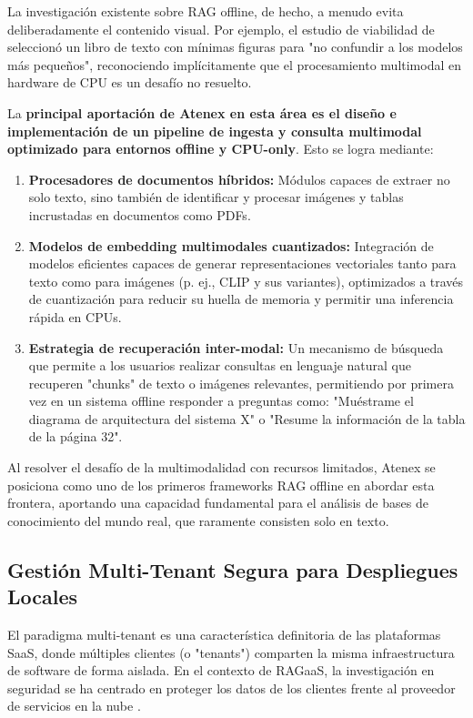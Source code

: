 La investigación existente sobre RAG offline, de hecho, a menudo evita deliberadamente el contenido visual. Por ejemplo, el estudio de viabilidad de \cite{Tyndall2025OfflineRAG} seleccionó un libro de texto con mínimas figuras para "no confundir a los modelos más pequeños", reconociendo implícitamente que el procesamiento multimodal en hardware de CPU es un desafío no resuelto.

La \textbf{principal aportación de Atenex en esta área es el diseño e implementación de un pipeline de ingesta y consulta multimodal optimizado para entornos offline y CPU-only}. Esto se logra mediante:
\begin{enumerate}
    \item \textbf{Procesadores de documentos híbridos:} Módulos capaces de extraer no solo texto, sino también de identificar y procesar imágenes y tablas incrustadas en documentos como PDFs.
    \item \textbf{Modelos de embedding multimodales cuantizados:} Integración de modelos eficientes capaces de generar representaciones vectoriales tanto para texto como para imágenes (p. ej., CLIP y sus variantes), optimizados a través de cuantización para reducir su huella de memoria y permitir una inferencia rápida en CPUs.
    \item \textbf{Estrategia de recuperación inter-modal:} Un mecanismo de búsqueda que permite a los usuarios realizar consultas en lenguaje natural que recuperen "chunks" de texto o imágenes relevantes, permitiendo por primera vez en un sistema offline responder a preguntas como: "Muéstrame el diagrama de arquitectura del sistema X" o "Resume la información de la tabla de la página 32".
\end{enumerate}
Al resolver el desafío de la multimodalidad con recursos limitados, Atenex se posiciona como uno de los primeros frameworks RAG offline en abordar esta frontera, aportando una capacidad fundamental para el análisis de bases de conocimiento del mundo real, que raramente consisten solo en texto.

\subsection{Gestión Multi-Tenant Segura para Despliegues Locales}

El paradigma multi-tenant es una característica definitoria de las plataformas SaaS, donde múltiples clientes (o "tenants") comparten la misma infraestructura de software de forma aislada. En el contexto de RAGaaS, la investigación en seguridad se ha centrado en proteger los datos de los clientes frente al proveedor de servicios en la nube \cite{Cheng2025RemoteRAG, Ammann2025SecuringRAG}.

